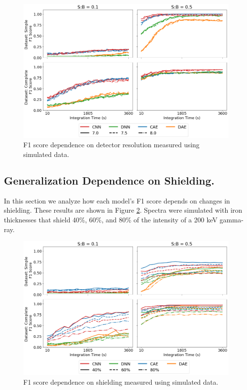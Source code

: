 \begin{figure}[H]
	\centering
	\includegraphics[width=1.0\linewidth]{images/sim-generalization-fwhm}
	\caption{F1 score dependence on detector resolution measured using simulated data.}
	\label{fig:sim-generalization-fwhm}
\end{figure}


\subsection{Generalization Dependence on Shielding.}

In this section we analyze how each model's F1 score depends on changes in shielding. These results are shown in Figure \ref{fig:sim-generalization-ironshield}. Spectra were simulated with iron thicknesses that shield 40\%, 60\%, and 80\% of the intensity of a 200 keV gamma-ray.

\begin{figure}[H]
	\centering
	\includegraphics[width=1.0\linewidth]{images/sim-generalization-ironshield}
	\caption{F1 score dependence on shielding measured using simulated data.}
	\label{fig:sim-generalization-ironshield}
\end{figure}

